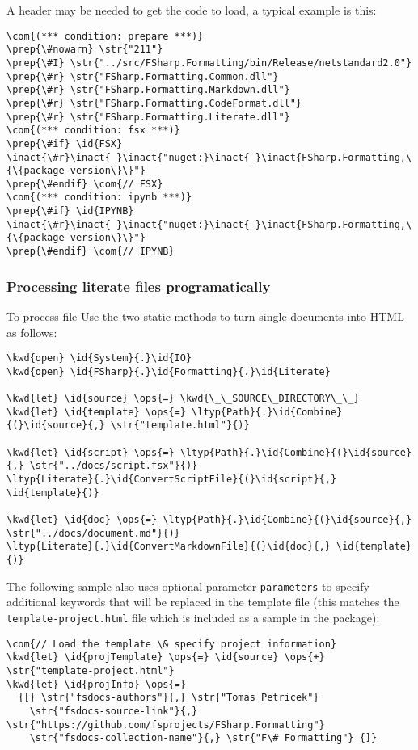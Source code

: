 \documentclass{article}
\newcommand{\id}[1]{\textcolor{black}{#1}}
\newcommand{\com}[1]{\textcolor{officegreen}{#1}}
\newcommand{\inact}[1]{\textcolor{gray}{#1}}
\newcommand{\kwd}[1]{\textcolor{navy}{#1}}
\newcommand{\ops}[1]{\textcolor{purple}{#1}}
\newcommand{\prep}[1]{\textcolor{purple}{#1}}
\newcommand{\str}[1]{\textcolor{olive}{#1}}
\begin{document}
A header may be needed to get the code to load, a typical example is this:
\begin{Verbatim}[commandchars=\\\{\}]
\com{(*** condition: prepare ***)}
\prep{\#nowarn} \str{"211"}
\prep{\#I} \str{"../src/FSharp.Formatting/bin/Release/netstandard2.0"}
\prep{\#r} \str{"FSharp.Formatting.Common.dll"}
\prep{\#r} \str{"FSharp.Formatting.Markdown.dll"}
\prep{\#r} \str{"FSharp.Formatting.CodeFormat.dll"}
\prep{\#r} \str{"FSharp.Formatting.Literate.dll"}
\com{(*** condition: fsx ***)}
\prep{\#if} \id{FSX}
\inact{\#r}\inact{ }\inact{"nuget:}\inact{ }\inact{FSharp.Formatting,\{\{package-version\}\}"}
\prep{\#endif} \com{// FSX}
\com{(*** condition: ipynb ***)}
\prep{\#if} \id{IPYNB}
\inact{\#r}\inact{ }\inact{"nuget:}\inact{ }\inact{FSharp.Formatting,\{\{package-version\}\}"}
\prep{\#endif} \com{// IPYNB}

\end{Verbatim}

\subsubsection*{Processing literate files programatically}



To process file Use the two static methods to turn single documents into HTML
as follows:
\begin{Verbatim}[commandchars=\\\{\}]
\kwd{open} \id{System}{.}\id{IO}
\kwd{open} \id{FSharp}{.}\id{Formatting}{.}\id{Literate}

\kwd{let} \id{source} \ops{=} \kwd{\_\_SOURCE\_DIRECTORY\_\_}
\kwd{let} \id{template} \ops{=} \ltyp{Path}{.}\id{Combine}{(}\id{source}{,} \str{"template.html"}{)}

\kwd{let} \id{script} \ops{=} \ltyp{Path}{.}\id{Combine}{(}\id{source}{,} \str{"../docs/script.fsx"}{)}
\ltyp{Literate}{.}\id{ConvertScriptFile}{(}\id{script}{,} \id{template}{)}

\kwd{let} \id{doc} \ops{=} \ltyp{Path}{.}\id{Combine}{(}\id{source}{,} \str{"../docs/document.md"}{)}
\ltyp{Literate}{.}\id{ConvertMarkdownFile}{(}\id{doc}{,} \id{template}{)}
\end{Verbatim}



The following sample also uses optional parameter \texttt{parameters} to specify additional
keywords that will be replaced in the template file (this matches the \texttt{template-project.html}
file which is included as a sample in the package):
\begin{Verbatim}[commandchars=\\\{\}]
\com{// Load the template \& specify project information}
\kwd{let} \id{projTemplate} \ops{=} \id{source} \ops{+} \str{"template-project.html"}
\kwd{let} \id{projInfo} \ops{=}
  {[} \str{"fsdocs-authors"}{,} \str{"Tomas Petricek"}
    \str{"fsdocs-source-link"}{,} \str{"https://github.com/fsprojects/FSharp.Formatting"}
    \str{"fsdocs-collection-name"}{,} \str{"F\# Formatting"} {]}
\end{Verbatim}
\end{document}
